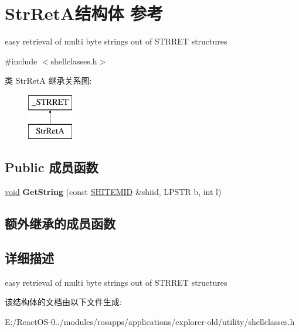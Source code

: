\hypertarget{struct_str_ret_a}{}\section{Str\+Ret\+A结构体 参考}
\label{struct_str_ret_a}


easy retrieval of multi byte strings out of S\+T\+R\+R\+ET structures  




{\ttfamily \#include $<$shellclasses.\+h$>$}

类 Str\+RetA 继承关系图\+:\begin{figure}[H]
\begin{center}
\leavevmode
\includegraphics[height=2.000000cm]{struct_str_ret_a}
\end{center}
\end{figure}
\subsection*{Public 成员函数}
\begin{DoxyCompactItemize}
\item 
\mbox{\label{struct_str_ret_a_aade5a26f26f9e3416a43496808a28178}} 
\hyperlink{interfacevoid}{void} {\bfseries Get\+String} (const \hyperlink{struct_s_h_i_t_e_m_i_d}{S\+H\+I\+T\+E\+M\+ID} \&shiid, L\+P\+S\+TR b, int l)
\end{DoxyCompactItemize}
\subsection*{额外继承的成员函数}


\subsection{详细描述}
easy retrieval of multi byte strings out of S\+T\+R\+R\+ET structures 

该结构体的文档由以下文件生成\+:\begin{DoxyCompactItemize}
\item 
E\+:/\+React\+O\+S-\/0../modules/rosapps/applications/explorer-\/old/utility/shellclasses.\+h\end{DoxyCompactItemize}
